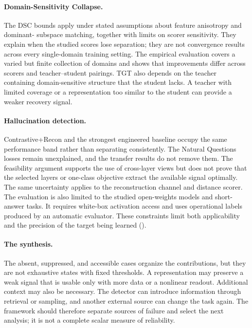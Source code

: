\paragraph{Domain-Sensitivity Collapse.}
The DSC bounds apply under stated assumptions about feature anisotropy and dominant-
subspace matching, together with limits on scorer sensitivity. They explain when the
studied scores lose separation; they are not convergence results across every
single-domain training setting.
The empirical evaluation covers a varied but finite collection of domains and shows
that improvements differ across scorers and teacher--student pairings. TGT also
depends on the teacher containing domain-sensitive structure that the student lacks.
A teacher with limited coverage or a representation too similar to the student can
provide a weaker recovery signal.

\paragraph{Hallucination detection.}
Contrastive+Recon and the strongest engineered baseline occupy the same performance
band rather than separating consistently. The Natural Questions losses remain
unexplained, and the transfer results do not remove them. The feasibility argument
supports the use
of cross-layer views but does not prove that the selected layers or one-class
objective extract the available signal optimally. The same uncertainty applies to
the reconstruction channel and distance scorer. The evaluation is also limited to
the studied open-weights models and short-answer tasks. It requires white-box
activation access and uses operational labels produced by an automatic evaluator.
These constraints limit both applicability and the precision of the target being
learned ().

\paragraph{The synthesis.}
The absent, suppressed, and accessible cases organize the contributions, but they
are not exhaustive states with fixed thresholds. A representation may preserve a
weak signal that is usable only with more data or a nonlinear readout. Additional
context may also be necessary. The detector can introduce information through
retrieval or sampling, and another external source can change the task again. The
framework should therefore separate sources of failure and select the next analysis;
it is not a complete scalar measure of reliability.


